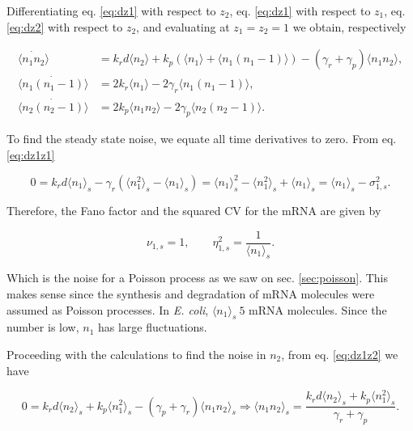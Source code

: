 Differentiating eq. \eqref{eq:dz1} with respect to $z_2$, eq. \eqref{eq:dz1} with respect to $z_1$, eq. \eqref{eq:dz2} with respect to $z_2$, and evaluating at $z_1 = z_2 = 1$ we obtain, respectively

\begin{align}
  \dot{\langle n_1n_2\rangle} &= k_rd\langle n_2 \rangle + k_p\left(\langle n_1\rangle + \langle n_1(n_1-1) \rangle \right) - \left( \gamma_r + \gamma_p \right)\langle n_1n_2 \rangle,\label{eq:dz1z2}\\
  \dot{\langle n_1(n_1-1)\rangle} &= 2k_r\langle n_1\rangle-2\gamma_r\langle n_1(n_1-1) \rangle, \label{eq:dz1z1}\\
  \dot{\langle n_2(n_2-1)\rangle} &= 2k_p\langle n_1n_2 \rangle - 2\gamma_p\langle n_2(n_2-1)\rangle. \label{eq:dz2z2}
\end{align}

To find the steady state noise, we equate all time derivatives to zero. From  eq. \eqref{eq:dz1z1}

\begin{equation}
  \label{eq:pren1}
  0 = k_rd \langle n_1 \rangle_s -\gamma_r \left(\langle n_1^2 \rangle_s - \langle n_1 \rangle_s \right) = \langle n_1 \rangle_s^2 - \langle n_1^2 \rangle_s + \langle n_1 \rangle_s = \langle n_1 \rangle_s - \sigma_{1,s}^2.
\end{equation}

Therefore, the Fano factor and the squared CV for the mRNA are given by

\begin{equation}
  \label{noise1}
  \nu_{1,s} = 1, \quad\quad \eta_{1,s}^2 = \frac{1}{\langle n_1 \rangle_s}.
\end{equation}

Which is the noise for a Poisson process as we saw on sec. \ref{sec:poisson}. This makes sense since the synthesis and degradation of mRNA molecules were assumed as Poisson processes. In \textit{E. coli}, $\langle n_1\rangle_s ~ 5$ mRNA molecules. Since the number is low, $n_1$ has large fluctuations.

Proceeding with the calculations to find the noise in $n_2$, from eq. \eqref{eq:dz1z2} we have

\begin{equation*}
  0 = k_rd \langle n_2 \rangle_s + k_p \langle n_1^2 \rangle_s - (\gamma_p + \gamma_r) \langle n_1n_2 \rangle_s \Rightarrow \langle n_1n_2 \rangle_s  = \frac{k_rd\langle n_2\rangle_s+k_p\langle n_1^2\rangle_s}{\gamma_r+\gamma_p}.
\end{equation*}

